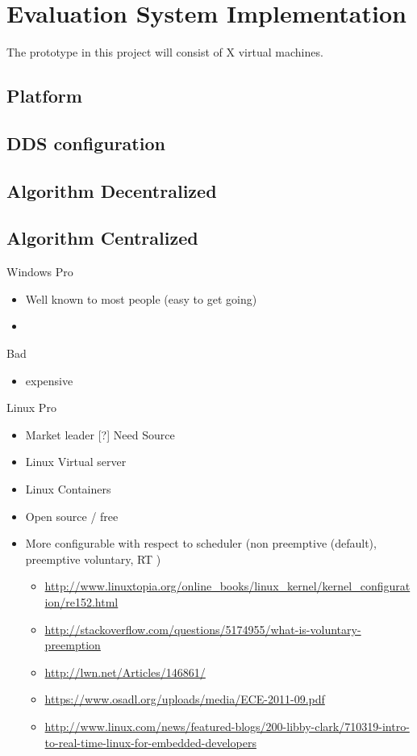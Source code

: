 \chapter{Evaluation System Implementation}
The prototype in this project will consist of X virtual machines.

\section{Platform}

\section{DDS configuration}

\section{Algorithm Decentralized}\label{sec:algoDecen}

\section{Algorithm Centralized}\label{sec:algoCen}

Windows
Pro
\begin{itemize}
	\item Well known to most people (easy to get going) 
	\item 
\end{itemize}

Bad
\begin{itemize}
	\item expensive
\end{itemize}

Linux
Pro
\begin{itemize}
	\item Market leader [?] Need Source
	\item Linux Virtual server
	\item Linux Containers
	\item Open source / free
	\item More configurable with respect to scheduler (non preemptive (default), preemptive voluntary, RT ) 
	\begin{itemize}
		\item \url{http://www.linuxtopia.org/online_books/linux_kernel/kernel_configuration/re152.html}
		\item \url{http://stackoverflow.com/questions/5174955/what-is-voluntary-preemption}
		\item \url{http://lwn.net/Articles/146861/}
		\item \url{https://www.osadl.org/uploads/media/ECE-2011-09.pdf}
		\item \url{http://www.linux.com/news/featured-blogs/200-libby-clark/710319-intro-to-real-time-linux-for-embedded-developers}
								
	\end{itemize}
\end{itemize}



